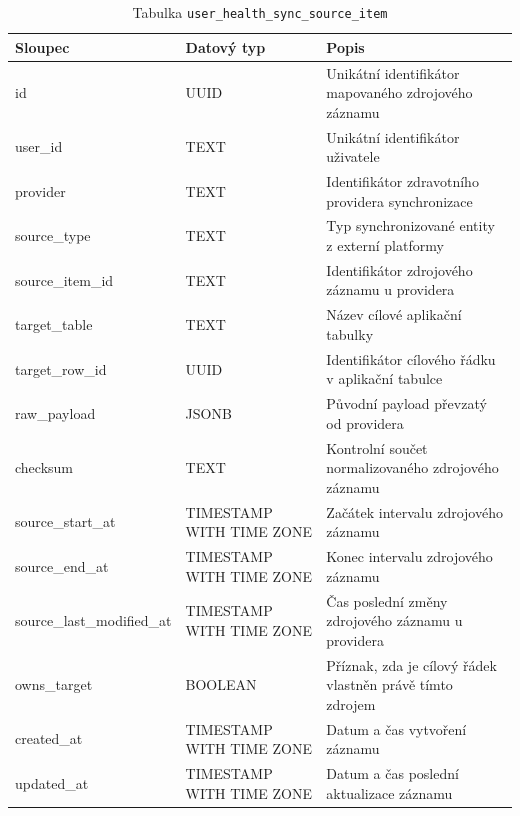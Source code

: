 \begin{table}[ht!]
    \centering
    \small
    \begin{tabularx}{\textwidth}{|l|l|L|}
        \hline
        \textbf{Sloupec}           & \textbf{Datový typ}      & \textbf{Popis}                                            \\ \hline
        id                         & UUID                     & Unikátní identifikátor mapovaného zdrojového záznamu      \\ \hline
        user\_id                   & TEXT                     & Unikátní identifikátor uživatele                          \\ \hline
        provider                   & TEXT                     & Identifikátor zdravotního providera synchronizace         \\ \hline
        source\_type               & TEXT                     & Typ synchronizované entity z externí platformy            \\ \hline
        source\_item\_id           & TEXT                     & Identifikátor zdrojového záznamu u providera              \\ \hline
        target\_table              & TEXT                     & Název cílové aplikační tabulky                            \\ \hline
        target\_row\_id            & UUID                     & Identifikátor cílového řádku v aplikační tabulce          \\ \hline
        raw\_payload               & JSONB                    & Původní payload převzatý od providera                     \\ \hline
        checksum                   & TEXT                     & Kontrolní součet normalizovaného zdrojového záznamu       \\ \hline
        source\_start\_at          & TIMESTAMP WITH TIME ZONE & Začátek intervalu zdrojového záznamu                      \\ \hline
        source\_end\_at            & TIMESTAMP WITH TIME ZONE & Konec intervalu zdrojového záznamu                        \\ \hline
        source\_last\_modified\_at & TIMESTAMP WITH TIME ZONE & Čas poslední změny zdrojového záznamu u providera         \\ \hline
        owns\_target               & BOOLEAN                  & Příznak, zda je cílový řádek vlastněn právě tímto zdrojem \\ \hline
        created\_at                & TIMESTAMP WITH TIME ZONE & Datum a čas vytvoření záznamu                             \\ \hline
        updated\_at                & TIMESTAMP WITH TIME ZONE & Datum a čas poslední aktualizace záznamu                  \\ \hline
    \end{tabularx}
    \caption{Tabulka \texttt{user\_health\_sync\_source\_item}}
    \label{tab:user_health_sync_source_item}
\end{table}
